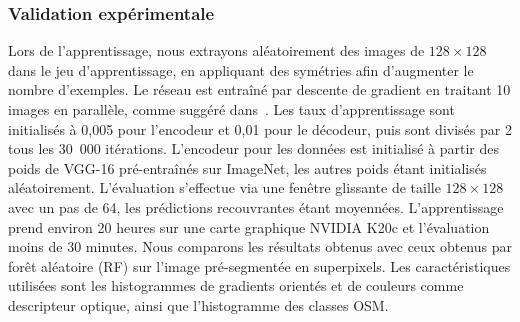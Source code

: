 \subsubsection{Validation expérimentale}
Lors de l'apprentissage, nous extrayons aléatoirement des images de $128\times128$ dans le jeu d'apprentissage, en appliquant des symétries afin d'augmenter le nombre d'exemples. Le réseau est entraîné par descente de gradient en traitant 10 images en parallèle, comme suggéré dans~\cite{audebert_semantic_2016}. Les taux d'apprentissage sont initialisés à 0,005 pour l'encodeur et 0,01 pour le décodeur, puis sont divisés par 2 tous les 30~000 itérations. L'encodeur pour les données  est initialisé à partir des poids de VGG-16 pré-entraînés sur ImageNet, les autres poids étant initialisés aléatoirement.
L'évaluation s'effectue via une fenêtre glissante de taille $128\times128$ avec un pas de 64, les prédictions recouvrantes étant moyennées. L'apprentissage prend environ 20 heures sur une carte graphique NVIDIA K20c et l'évaluation moins de 30 minutes. Nous comparons les résultats obtenus avec ceux obtenus par forêt aléatoire (RF) sur l'image pré-segmentée en superpixels. Les caractéristiques utilisées sont les histogrammes de gradients orientés et de couleurs comme descripteur optique, ainsi que l'histogramme des classes \gls{OSM}.

